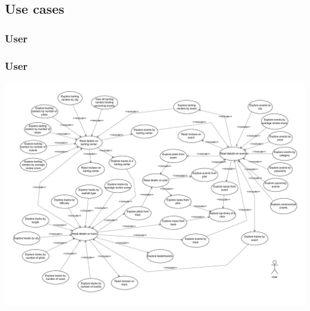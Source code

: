 \documentclass{beamer}
\begin{document}


\subsection{Use cases}

\subsubsection{User}

\begin{frame}
    \frametitle{User}
    \centering
    \includegraphics[width=0.8\linewidth]{drawio/user.pdf}
\end{frame}

\end{document}
